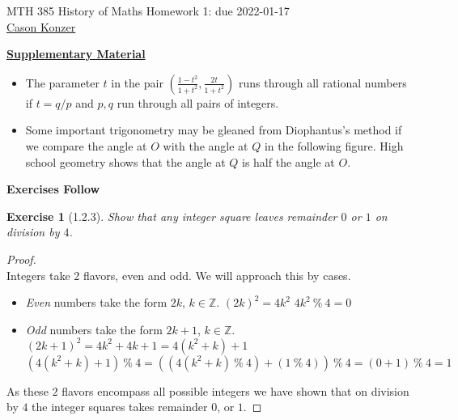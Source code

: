 \documentclass[10pt]{article}
\theoremstyle{plain}
\newtheorem{ex}{Exercise}
\begin{document}
MTH 385 \qquad History of Maths \qquad Homework 1: due 2022-01-17 \\
\color{purple}\underline{Cason Konzer}\color{black}

\hrulefill

\underline{\textbf{Supplementary Material}}
\color{blue}

\begin{itemize}
  \item The parameter $t$ in the pair $\displaystyle \left(\frac{1-t^2}{1+t^2},\frac{2t}{1+t^2}\right)$ runs through all rational numbers if $t=q/p$ and $p,q$ run through all pairs of integers.
  \item Some important trigonometry may be gleaned from Diophantus's method if we compare the angle at $O$ with the angle at $Q$ in the following figure. High school geometry shows that the angle at $Q$ is half the angle at $O$.
\end{itemize}

\color{black}

\begin{center}
\end{center}

\hrulefill

\begin{center}
  \textbf{Exercises Follow}
\end{center}

\newpage

\begin{ex} [1.2.3]
  Show that any integer square leaves remainder $0$ or $1$ on division by $4$.
\end{ex}

\begin{proof}
  \ \\
  Integers take 2 flavors, even and odd. We will approach this by cases. 
  \begin{itemize}
    \item \textit{Even} numbers take the form $2k$, $k \in \mathbb{Z} $.
    \subitem $(2k)^{2} = 4k^{2}$ 
    \subitem $4k^{2} \ \% \ {4} = 0$
    \item \textit{Odd} numbers take the form $2k+1$, $k \in \mathbb{Z} $.
    \subitem $(2k+1)^{2} = 4k^{2}+4k+1 = 4(k^{2}+k)+1$
    \subitem $(4(k^{2}+k)+1) \ \% \ {4} = ((4(k^{2}+k) \ \% \ {4})+(1 \ \% \ {4})) \ \% \ {4} = (0+1) \ \% \ {4} = 1$
  \end{itemize}
  As these $2$ flavors encompass all possible integers we have shown that on division by $4$ the integer squares takes remainder $0$, or $1$.
\end{proof} 
\end{document}
